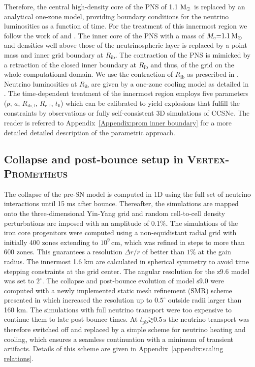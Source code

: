 \documentclass[fleqn,usenatbib]{mnras}
\newcommand{\tpb}{\ensuremath{t_{\text{pb}}}}
\newcommand{\solm}{\ensuremath{\rm{M_{\odot}}}\xspace}
\newcommand{\s}{\ensuremath{\text{s}}}
\newcommand{\vertexprom}{\textsc{Vertex-Prometheus}\xspace}
\newcommand{\snine}{\ensuremath{\mathrm{s9.0}}\xspace}
\newcommand{\znine}{\ensuremath{\mathrm{z9.6}}\xspace}
\begin{document}
Therefore, the central high-density core of the PNS of 1.1 \solm is 
replaced by an analytical one-zone model, providing boundary conditions 
for the neutrino luminosities as a function of time.
For the treatment of this innermost region we follow the work of 
\cite{Ugliano2012} and \cite{Sukhbold2016}. 
The inner core of the PNS with a mass of 
$M_{\mathrm{c}}\mathord{=}1.1\,\solm$ and densities well above 
those of the neutrinospheric layer is replaced by a point mass 
and inner grid boundary at $R_{\mathrm{ib}}$. The contraction of 
the PNS is mimicked by a retraction of the closed inner boundary 
at $R_{\mathrm{ib}}$ and thus, of the grid on the whole 
computational domain. We use the contraction of $R_{\mathrm{ib}}$ 
as prescribed in \cite{Ertl2016}.
Neutrino luminosities at $R_{\mathrm{ib}}$ are given by a one-zone 
cooling model as detailed in \cite{Ugliano2012}.
The time-dependent treatment of the innermost region employs five 
parameters ($p$, $a$, $R_{\mathrm{ib,f}}$, $R_{\mathrm{c,f}}$, $t_{0}$) 
which can be calibrated to yield explosions that fulfill the constraints 
by observations or fully self-consistent 3D simulations of CCSNe.
The reader is referred to 
Appendix~\ref{Appendix:prom inner boundary} for a more detailed 
detailed description of the parametric approach.

\subsection{Collapse and post-bounce setup in \vertexprom}
\label{sec:Collapse and post-bounce setup in vertexprom}
The collapse of the pre-SN model is computed in 1D using the 
full set of neutrino interactions until 15 ms after bounce. Thereafter, 
the simulations are mapped onto the three-dimensional Yin-Yang 
grid and random cell-to-cell density perturbations are imposed 
with an amplitude of 0.1\%. 
The simulations of the iron core progenitors were computed using a 
non-equidistant radial grid with initially 400 zones extending 
to $10^9\,\text{cm}$, which was refined in steps to more than 600 zones. 
This guarantees a resolution $\Delta r/r$ of better than $1\%$ at 
the gain radius. The innermost 1.6 km are calculated in spherical 
symmetry to avoid time stepping constraints at the grid center.
The angular resolution for the \znine model was set to $2^{\circ}$. 
The collapse and post-bounce evolution of model \snine were computed 
with a newly implemented static mesh refinement (SMR) scheme presented in 
\cite{Melson2019} which increased the resolution up to $0.5^{\circ}$ 
outside radii larger than 160 km.
The simulations with full neutrino transport were 
too expensive to continue them to late post-bounce times. 
At $\tpb \mathord{\gtrsim} 0.5\,\s$ the neutrino transport was therefore 
switched off and replaced by a simple scheme for neutrino heating 
and cooling, which ensures a seamless continuation with a minimum 
of transient artifacts. Details of this scheme are given in 
Appendix~\ref{appendix:scaling relations}.
\end{document}
